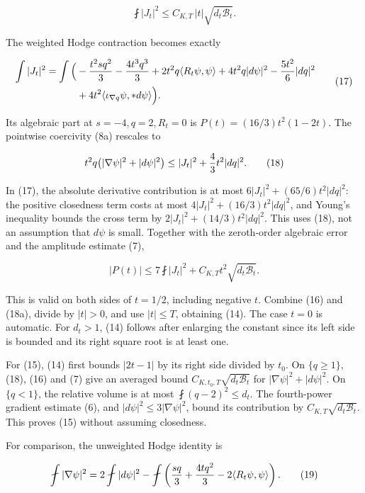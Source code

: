 \documentclass[
  10pt,
]{article}
\begin{document}
\[
                  \fint|J_t|^2\le C_{K,T}\,|t|
                                      \sqrt{d_t\mathcal B_t}. \tag{16}
\]

The weighted Hodge contraction becomes exactly

\[
\begin{aligned}
 \int|J_t|^2=\int\Big(&-{t^2s q^2\over3}
       -{4t^3q^3\over3}+2t^2q\langle R_t\psi,\psi\rangle
       +4t^2q|d\psi|^2-{5t^2\over6}|dq|^2\\
       &+4t^2\langle\iota_{\nabla q}\psi,*d\psi\rangle
                    \Big).                               
\end{aligned}\tag{17}
\]

Its algebraic part at \(s=-4,q=2,R_t=0\) is \(P(t)=(16/3)t^2(1-2t)\).
The pointwise coercivity (8a) rescales to

\[
 t^2q\bigl(|\nabla\psi|^2+|d\psi|^2\bigr)
          \le |J_t|^2+{4\over3}t^2|dq|^2.                \tag{18}
\]

In (17), the absolute derivative contribution is at most
\(6|J_t|^2+(65/6)t^2|dq|^2\): the positive closedness term costs at most
\(4|J_t|^2+(16/3)t^2|dq|^2\), and Young's inequality bounds the cross
term by \(2|J_t|^2+(14/3)t^2|dq|^2\). This uses (18), not an assumption
that \(d\psi\) is small. Together with the zeroth-order algebraic error
and the amplitude estimate (7),

\[
 |P(t)|\le 7\fint|J_t|^2+
                  C_{K,T}t^2\sqrt{d_t\mathcal B_t}.       \tag{18a}
\]

This is valid on both sides of \(t=1/2\), including negative \(t\).
Combine (16) and (18a), divide by \(|t|>0\), and use \(|t|\le T\),
obtaining (14). The case \(t=0\) is automatic. For \(d_t>1\), (14)
follows after enlarging the constant since its left side is bounded and
its right square root is at least one.

For (15), (14) first bounds \(|2t-1|\) by its right side divided by
\(t_0\). On \(\{q\ge1\}\), (18), (16) and (7) give an averaged bound
\(C_{K,t_0,T}\sqrt{d_t\mathcal B_t}\) for \(|\nabla\psi|^2+|d\psi|^2\).
On \(\{q<1\}\), the relative volume is at most \(\fint(q-2)^2\le d_t\).
The fourth-power gradient estimate (6), and
\(|d\psi|^2\le3|\nabla\psi|^2\), bound its contribution by
\(C_{K,T}\sqrt{d_t\mathcal B_t}\). This proves (15) without assuming
closedness.

For comparison, the unweighted Hodge identity is

\[
 \fint|\nabla\psi|^2
 =2\fint|d\psi|^2-
  \fint\left({s q\over3}+{4tq^2\over3}
                               -2\langle R_t\psi,\psi\rangle\right).
                                                               \tag{19}
\]
\end{document}
